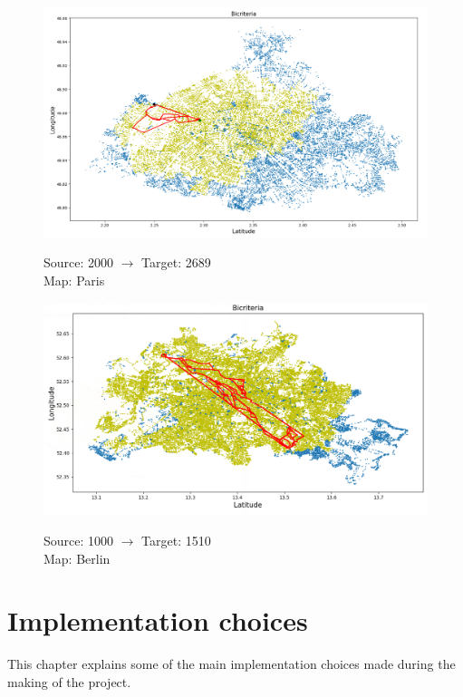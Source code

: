 \documentclass[a4paper,11pt]{report}
\begin{document}
\begin{figure}[H]
	\centering
	\includegraphics[width=\textwidth]{img/mapOutput/2000->2689Bicriteria.png}
	\label{fig:Bicriteria2}
	\hfill
	\begin{center}
		Source: 2000 $\to$ Target: 2689\\Map: Paris
	\end{center}
\end{figure}
\begin{figure}[H]
	\centering
	\includegraphics[width=\textwidth]{img/mapOutput/1000->1510BerlinBicriteria.png}
	\label{fig:Bicriteria3}
	\hfill
	\begin{center}
		Source: 1000 $\to$ Target: 1510\\Map: Berlin
	\end{center}
\end{figure}

\chapter{Implementation choices}
This chapter explains some of the main implementation choices made during the making of the project.
\end{document}
